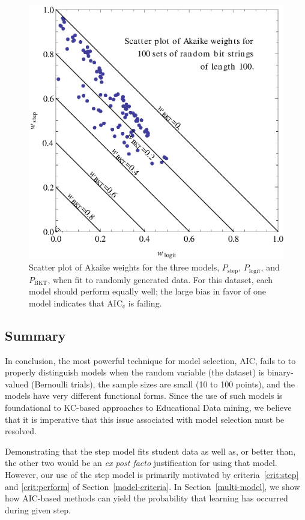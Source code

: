\documentclass[11pt,letterpaper]{article}
\begin{document}
\begin{figure}
  \centering \includegraphics{scatter-random-weights.eps}
  \caption{Scatter plot of Akaike weights for the three models, 
   $P_\mathrm{step}$, $P_\mathrm{logit}$, and $P_\mathrm{BKT}$, 
   when fit to randomly generated data.  For this dataset, each 
   model should perform
   equally well; the large bias in favor of one model indicates
   that  AIC$_\mathrm{c}$ is failing.}\label{scatter2}
\end{figure}

\subsection{Summary}

In conclusion, the most powerful technique for model selection,
AIC, fails to to properly distinguish models when the random
variable (the dataset) is binary-valued (Bernoulli trials),
the sample sizes are small (10 to 100 points), and the models
have very different functional forms.  Since the use of such
models is foundational to KC-based approaches to Educational
Data mining, we believe that it is imperative that this issue 
associated with model selection must be resolved.

Demonstrating that the step model fits student data as well as,
or better than, the other two would be an
{\em ex post facto} justification for using that model.  
However, our use of the step model is primarily motivated
by criteria~\ref{crit:step} and \ref{crit:perform} of 
Section~\ref{model-criteria}.
In Section~\ref{multi-model}, we show how AIC-based methods
can yield the probability that learning has occurred during given step.
\end{document}
